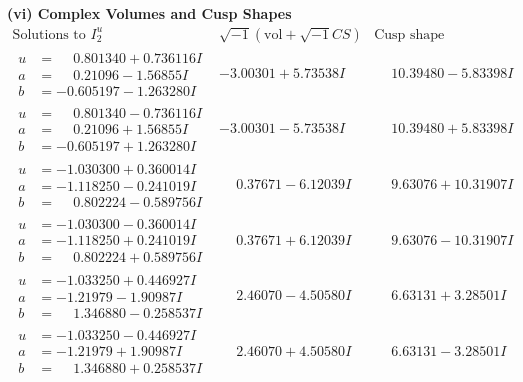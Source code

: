 \documentclass[1p]{elsarticle_modified}
\theoremstyle{definition}
\newcommand{\I}{\sqrt{-1}}
\begin{document}
\newpage\flushleft \textbf{(vi) Complex Volumes and Cusp Shapes}
$$\begin{array}{c|c|c}  
\text{Solutions to }I^u_{2}& \I (\text{vol} + \sqrt{-1}CS) & \text{Cusp shape}\\
 \hline 
\begin{aligned}
u &= \phantom{-}0.801340 + 0.736116 I \\
a &= \phantom{-}0.21096 - 1.56855 I \\
b &= -0.605197 - 1.263280 I\end{aligned}
 & -3.00301 + 5.73538 I & \phantom{-}10.39480 - 5.83398 I \\ \hline\begin{aligned}
u &= \phantom{-}0.801340 - 0.736116 I \\
a &= \phantom{-}0.21096 + 1.56855 I \\
b &= -0.605197 + 1.263280 I\end{aligned}
 & -3.00301 - 5.73538 I & \phantom{-}10.39480 + 5.83398 I \\ \hline\begin{aligned}
u &= -1.030300 + 0.360014 I \\
a &= -1.118250 - 0.241019 I \\
b &= \phantom{-}0.802224 - 0.589756 I\end{aligned}
 & \phantom{-}0.37671 - 6.12039 I & \phantom{-}9.63076 + 10.31907 I \\ \hline\begin{aligned}
u &= -1.030300 - 0.360014 I \\
a &= -1.118250 + 0.241019 I \\
b &= \phantom{-}0.802224 + 0.589756 I\end{aligned}
 & \phantom{-}0.37671 + 6.12039 I & \phantom{-}9.63076 - 10.31907 I \\ \hline\begin{aligned}
u &= -1.033250 + 0.446927 I \\
a &= -1.21979 - 1.90987 I \\
b &= \phantom{-}1.346880 - 0.258537 I\end{aligned}
 & \phantom{-}2.46070 - 4.50580 I & \phantom{-}6.63131 + 3.28501 I \\ \hline\begin{aligned}
u &= -1.033250 - 0.446927 I \\
a &= -1.21979 + 1.90987 I \\
b &= \phantom{-}1.346880 + 0.258537 I\end{aligned}
 & \phantom{-}2.46070 + 4.50580 I & \phantom{-}6.63131 - 3.28501 I \\ \hline\begin{aligned}

\end{aligned}
\end{array}$$
\end{document}
